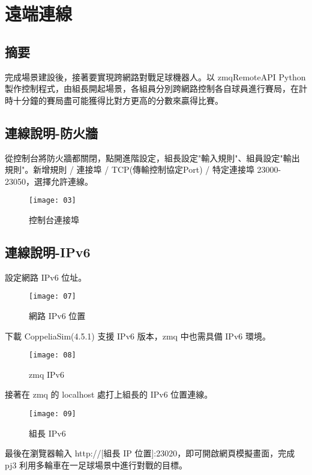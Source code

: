 \chapter{遠端連線}
\renewcommand{\baselinestretch}{10.0} %
\setcounter{page}{20}  %
\fontsize{14pt}{2.5pt}\sectionef
\section{摘要}
  完成場景建設後，接著要實現跨網路對戰足球機器人。以 zmqRemoteAPI Python 製作控制程式，由組長開起場景，各組員分別跨網路控制各自球員進行賽局，在計時十分鐘的賽局盡可能獲得比對方更高的分數來贏得比賽。\\
\section{連線說明-防火牆}
  從控制台將防火牆都關閉，點開進階設定，組長設定"輸入規則"、組員設定"輸出規則"。新增規則 / 連接埠 / TCP(傳輸控制協定Port) / 特定連接埠 23000-23050，選擇允許連線。\\
\begin{figure}[hbt!]
\begin{center}
\texttt{[image: 03]}
\caption{\Large 控制台連接埠}\label{fig.03}
\end{center}
\end{figure}
\section{連線說明-IPv6}
  設定網路 IPv6 位址。\\
\begin{figure}[hbt!]
\begin{center}
\texttt{[image: 07]}
\caption{\Large 網路 IPv6 位置}\label{fig.07}
\end{center}
\end{figure}

  下載 CoppeliaSim(4.5.1) 支援 IPv6 版本，zmq 中也需具備 IPv6 環境。\\
\begin{figure}[hbt!]
\begin{center}
\texttt{[image: 08]}
\caption{\Large zmq IPv6 }\label{fig.08}
\end{center}
\end{figure}

  接著在 zmq 的 localhost 處打上組長的 IPv6 位置連線。\\
\newpage
\begin{figure}[hbt!]
\begin{center}
\texttt{[image: 09]}
\caption{\Large 組長 IPv6 }\label{fig.09}
\end{center}
\end{figure}
  最後在瀏覽器輸入 http://[組長 IP 位置]:23020，即可開啟網頁模擬畫面，完成 pj3 利用多輪車在一足球場景中進行對戰的目標。\\
\renewcommand{\baselinestretch}{1} %
